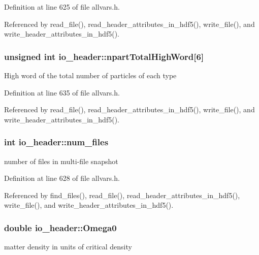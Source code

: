 Definition at line 625 of file allvars.h.



Referenced by read\_\-file(), read\_\-header\_\-attributes\_\-in\_\-hdf5(), write\_\-file(), and write\_\-header\_\-attributes\_\-in\_\-hdf5().

\hypertarget{structio__header_a56f54a68fe289b19902b3c4c561a7159}{
\subsubsection[{npartTotalHighWord}]{\setlength{\rightskip}{0pt plus 5cm}unsigned int {\bf io\_\-header::npartTotalHighWord}\mbox{[}6\mbox{]}}}
\label{structio__header_a56f54a68fe289b19902b3c4c561a7159}
High word of the total number of particles of each type 

Definition at line 635 of file allvars.h.



Referenced by read\_\-file(), read\_\-header\_\-attributes\_\-in\_\-hdf5(), write\_\-file(), and write\_\-header\_\-attributes\_\-in\_\-hdf5().

\hypertarget{structio__header_a5688351781a2845beb2c52a035cc5f71}{
\subsubsection[{num\_\-files}]{\setlength{\rightskip}{0pt plus 5cm}int {\bf io\_\-header::num\_\-files}}}
\label{structio__header_a5688351781a2845beb2c52a035cc5f71}
number of files in multi-\/file snapshot 

Definition at line 628 of file allvars.h.



Referenced by find\_\-files(), read\_\-file(), read\_\-header\_\-attributes\_\-in\_\-hdf5(), write\_\-file(), and write\_\-header\_\-attributes\_\-in\_\-hdf5().

\hypertarget{structio__header_af0d78ac0e8131523be64b3686aab9550}{
\subsubsection[{Omega0}]{\setlength{\rightskip}{0pt plus 5cm}double {\bf io\_\-header::Omega0}}}
\label{structio__header_af0d78ac0e8131523be64b3686aab9550}
matter density in units of critical density 

